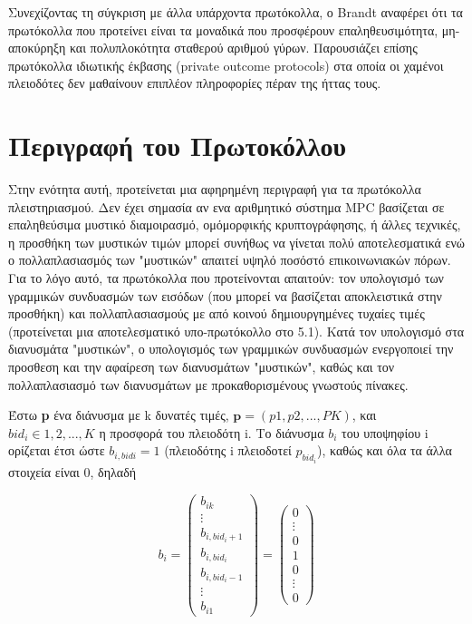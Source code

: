 \documentclass[a4paper,11pt]{article}
\begin{document}
	Συνεχίζοντας τη σύγκριση με άλλα υπάρχοντα πρωτόκολλα, ο Brandt αναφέρει ότι τα πρωτόκολλα που προτείνει είναι τα
	μοναδικά που προσφέρουν επαληθευσιμότητα, μη-αποκύρηξη και πολυπλοκότητα σταθερού αριθμού γύρων. Παρουσιάζει επίσης πρωτόκολλα
	ιδιωτικής έκβασης (private outcome protocols) στα οποία οι χαμένοι πλειοδότες δεν μαθαίνουν επιπλέον πληροφορίες πέραν της
	ήττας τους.
	
\section{Περιγραφή του Πρωτοκόλλου}

Στην ενότητα αυτή, προτείνεται μια αφηρημένη περιγραφή για τα πρωτόκολλα πλειστηριασμού. Δεν έχει σημασία αν ενα αριθμητικό σύστημα MPC βασίζεται
σε επαληθεύσιμα μυστικό διαμοιρασμό, ομόμορφικής κρυπτογράφησης, ή άλλες τεχνικές, η προσθήκη των μυστικών τιμών μπορεί συνήθως να γίνεται πολύ
αποτελεσματικά ενώ ο πολλαπλασιασμός των "μυστικών" απαιτεί υψηλό ποσόστό επικοινωνιακών πόρων. Για το λόγο αυτό, τα πρωτόκολλα που προτείνονται
απαιτούν: τον υπολογισμό των γραμμικών συνδυασμών των εισόδων (που μπορεί να βασίζεται αποκλειστικά στην προσθήκη) και πολλαπλασιασμούς με από
κοινού δημιουργημένες τυχαίες τιμές (προτείνεται μια αποτελεσματικό υπο-πρωτόκολλο στο 5.1). Κατά τον υπολογισμό στα διανυσμάτα "μυστικών", ο
υπολογισμός των γραμμικών συνδυασμών ενεργοποιεί την προσθεση και την αφαίρεση των διανυσμάτων "μυστικών", καθώς και τον πολλαπλασιασμό των
διανυσμάτων με προκαθορισμένους γνωστούς πίνακες.

Έστω \textbf{p} ένα διάνυσμα με k δυνατές τιμές, $\textbf{p}=(p1,p2,...,PK)$, και $bid_i \in {1, 2,. . . , K}$ η προσφορά του πλειοδότη i. Το
διάνυσμα $b_i$ του υποψηφίου i ορίζεται έτσι ώστε $b_{i,bidi}=1$ (πλειοδότης i πλειοδοτεί $p_{bid_i}$), καθώς και όλα τα άλλα στοιχεία είναι 0,
δηλαδή

\begin{displaymath}
	b_i = 
	\left ( \begin{array}{c}
		b_{ik}	\\
		\vdots	\\
		b_{i,bid_i+1} \\
		b_{i,bid_i}	\\
		b_{i,bid_i-1} \\
		\vdots \\
		b_{i1}
	\end{array} \right)
	=
	\left ( \begin{array}{c}
	0	\\
	\vdots \\
	0 \\
	1 \\
	0 \\
	\vdots \\
	0
	\end{array} \right)
\end{displaymath}
\end{document}
